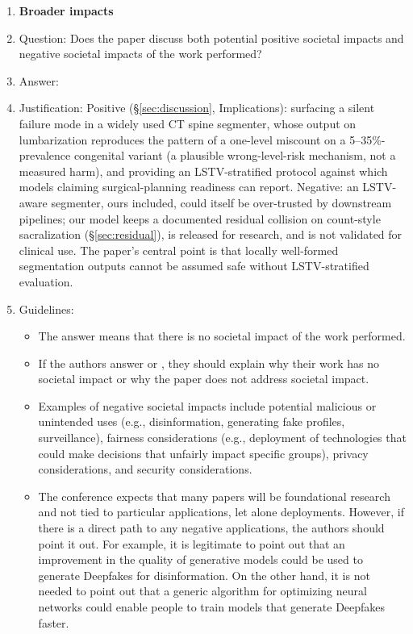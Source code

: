 \begin{enumerate}
\item {\bf Broader impacts}
    \item[] Question: Does the paper discuss both potential positive societal impacts and negative societal impacts of the work performed?
    \item[] Answer: \answerYes{}
    \item[] Justification: Positive (\S\ref{sec:discussion}, Implications): surfacing a silent failure mode in a widely used CT spine segmenter, whose output on lumbarization reproduces the pattern of a one-level miscount on a 5--35\%-prevalence congenital variant (a plausible wrong-level-risk mechanism, not a measured harm), and providing an LSTV-stratified protocol against which models claiming surgical-planning readiness can report. Negative: an LSTV-aware segmenter, ours included, could itself be over-trusted by downstream pipelines; our model keeps a documented residual collision on count-style sacralization (\S\ref{sec:residual}), is released for research, and is not validated for clinical use. The paper's central point is that locally well-formed segmentation outputs cannot be assumed safe without LSTV-stratified evaluation.
    \item[] Guidelines:
    \begin{itemize}
        \item The answer \answerNA{} means that there is no societal impact of the work performed.
        \item If the authors answer \answerNA{} or \answerNo, they should explain why their work has no societal impact or why the paper does not address societal impact.
        \item Examples of negative societal impacts include potential malicious or unintended uses (e.g., disinformation, generating fake profiles, surveillance), fairness considerations (e.g., deployment of technologies that could make decisions that unfairly impact specific groups), privacy considerations, and security considerations.
        \item The conference expects that many papers will be foundational research and not tied to particular applications, let alone deployments. However, if there is a direct path to any negative applications, the authors should point it out. For example, it is legitimate to point out that an improvement in the quality of generative models could be used to generate Deepfakes for disinformation. On the other hand, it is not needed to point out that a generic algorithm for optimizing neural networks could enable people to train models that generate Deepfakes faster.

\end{itemize}
\end{enumerate}
